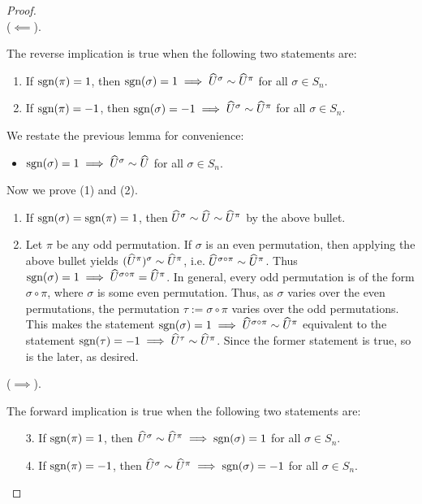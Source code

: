 \begin{proof}
    \mbox{} \\ \indent
    ($\impliedby$).
    
    The reverse implication is true when the following two statements are:
    
    \begin{enumerate}
        \item If $\text{sgn}(\pi) = 1$, then $\text{sgn}(\sigma) = 1 \implies \widehat{U}^\sigma \sim \widehat{U}^\pi$ for all $\sigma \in S_n$.
        \item If $\text{sgn}(\pi) = -1$, then $\text{sgn}(\sigma) = -1 \implies \widehat{U}^\sigma \sim \widehat{U}^\pi$ for all $\sigma \in S_n$.
    \end{enumerate}

    We restate the previous lemma for convenience:

    \begin{itemize}
        \item $\text{sgn}(\sigma) = 1 \implies \widehat{U}^\sigma \sim \widehat{U}$ for all $\sigma \in S_n$.
    \end{itemize}

    Now we prove (1) and (2).

    \begin{enumerate}
        \item If $\text{sgn}(\sigma) = \text{sgn}(\pi) = 1$, then $\widehat{U}^\sigma \sim \widehat{U} \sim \widehat{U}^\pi$ by the above bullet.
        \item Let $\pi$ be any odd permutation. If $\sigma$ is an even permutation, then applying the above bullet yields $(\widehat{U}^\pi)^\sigma \sim \widehat{U}^\pi$, i.e. $\widehat{U}^{\sigma \circ \pi} \sim \widehat{U}^\pi$. Thus $\text{sgn}(\sigma) = 1 \implies \widehat{U}^{\sigma \circ \pi} = \widehat{U}^\pi$. In general, every odd permutation is of the form $\sigma \circ \pi$, where $\sigma$ is some even permutation. Thus, as $\sigma$ varies over the even permutations, the permutation $\tau := \sigma \circ \pi$ varies over the odd permutations. This makes the statement $\text{sgn}(\sigma) = 1 \implies \widehat{U}^{\sigma \circ \pi} \sim \widehat{U}^\pi$ equivalent to the statement $\text{sgn}(\tau) = -1 \implies \widehat{U}^\tau \sim \widehat{U}^\pi$. Since the former statement is true, so is the later, as desired.
    \end{enumerate}

   ($\implies$).

    The forward implication is true when the following two statements are:

    \begin{enumerate}
        \item[3.] If $\text{sgn}(\pi) = 1$, then $\widehat{U}^\sigma \sim \widehat{U}^\pi \implies \text{sgn}(\sigma) = 1$ for all $\sigma \in S_n$.
        \item[4.] If $\text{sgn}(\pi) = -1$, then $\widehat{U}^\sigma \sim \widehat{U}^\pi \implies \text{sgn}(\sigma) = -1$ for all $\sigma \in S_n$.
    \end{enumerate}


\end{proof}
